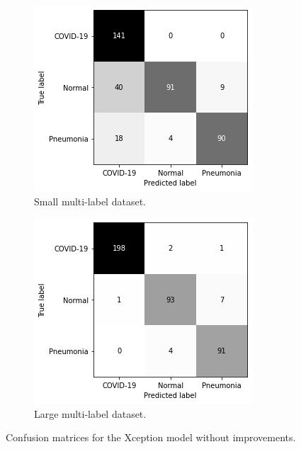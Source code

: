 \begin{figure}
    \begin{subfigure}[b]{0.49\textwidth}
        \centering
        \includegraphics[width=\textwidth]{figures/cm-no-improv-s-m.png}
        \caption{Small multi-label dataset.}
        \label{fig:cm-n-improv-s-m}
    \end{subfigure}
    \hfill
    \begin{subfigure}[b]{0.49\textwidth}
        \centering
        \includegraphics[width=\textwidth]{figures/cm-no-improv-l-m.png}
        \caption{Large multi-label dataset.}
        \label{fig:cm-n-improv-l-m}
    \end{subfigure}
    \caption{Confusion matrices for the Xception model without improvements.}
    \label{fig:cm-no-improv}
\end{figure}

